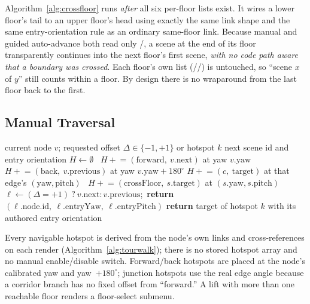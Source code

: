 Algorithm~\ref{alg:crossfloor} runs \emph{after} all six per-floor lists
exist. It wires a lower floor's tail to an upper floor's head using exactly
the same link shape and the same entry-orientation rule as an ordinary
same-floor link. Because manual  and guided
auto-advance both read only /, a scene
at the end of its floor transparently continues into the next floor's first
scene, \emph{with no code path aware that a boundary was crossed}. Each
floor's own list (//) is untouched, so
``scene $x$ of $y$'' still counts within a floor. By design there is no
wraparound from the last floor back to the first.

\subsection{Manual Traversal}
\begin{algorithm}[!t]
\caption{Manual Tour Hotspot Derivation and Step}
\label{alg:tourwalk}
\begin{algorithmic}[1]
\Require current node $v$; requested offset $\Delta\in\{-1,+1\}$ or hotspot $k$
\Ensure next scene id and entry orientation
\State $H \gets \emptyset$ 
\ $H \mathrel{+}= (\text{forward},\ v{.}\text{next})$ at yaw $v{.}\text{yaw}$ \EndIf
{}\ $H \mathrel{+}= (\text{back},\ v{.}\text{previous})$ at yaw $v{.}\text{yaw}{+}180^{\circ}$ \EndIf
{}
     \State $H \mathrel{+}= (c,\ \text{target})$ at that edge's $(\mathrm{yaw},\mathrm{pitch})$
  \EndIf
\EndFor
{}\ $H \mathrel{+}= (\text{crossFloor},\ s.\text{target})$ at $(s.\text{yaw},s.\text{pitch})$ \EndFor
{}
  \State $\ell \gets (\Delta = +1)\ ?\ v{.}\text{next} : v{.}\text{previous}$;\ \textbf{return} $(\ell{.}\text{node.id},\ \ell{.}\text{entryYaw},\ \ell{.}\text{entryPitch})$
\Else
  \State \textbf{return} target of hotspot $k$ with its authored entry orientation
\EndIf
\end{algorithmic}
\end{algorithm}
Every navigable hotspot is derived from the node's own links and
cross-references on each render (Algorithm~\ref{alg:tourwalk}); there is no
stored hotspot array and no manual enable/disable switch. Forward/back
hotspots are placed at the node's calibrated yaw and yaw~$+180^{\circ}$;
junction hotspots use the real edge angle because a corridor branch has no
fixed offset from ``forward.'' A lift with more than one reachable floor
renders a floor-select submenu.

